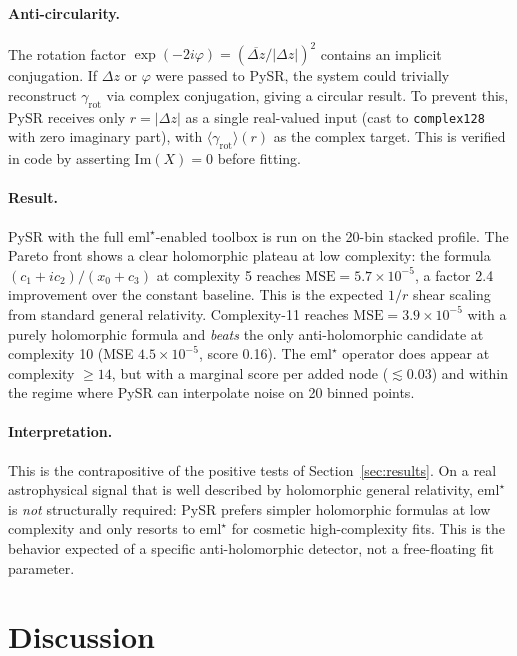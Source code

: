 \documentclass[12pt,a4paper]{article}
\newcommand{\emlstar}{\mathrm{eml}^{\star}}
\begin{document}
\paragraph{Anti-circularity.}
The rotation factor $\exp(-2i\varphi) = (\overline{\Delta z}/|\Delta z|)^2$
contains an implicit conjugation.
If $\Delta z$ or $\varphi$ were passed to PySR, the system could
trivially reconstruct $\gamma_\mathrm{rot}$ via complex conjugation,
giving a circular result.
To prevent this, PySR receives only $r = |\Delta z|$ as a single
real-valued input (cast to \texttt{complex128} with zero imaginary
part), with $\langle\gamma_\mathrm{rot}\rangle(r)$ as the complex
target.
This is verified in code by asserting $\mathrm{Im}(X) = 0$ before
fitting.

\paragraph{Result.}
PySR with the full $\emlstar$-enabled toolbox is run on the 20-bin
stacked profile.
The Pareto front shows a clear holomorphic plateau at low complexity:
the formula $(c_1 + ic_2) / (x_0 + c_3)$ at complexity 5 reaches
$\mathrm{MSE} = 5.7 \times 10^{-5}$, a factor 2.4 improvement over
the constant baseline.
This is the expected $1/r$ shear scaling from standard general
relativity.
Complexity-11 reaches $\mathrm{MSE} = 3.9 \times 10^{-5}$ with a
purely holomorphic formula and \emph{beats} the only
anti-holomorphic candidate at complexity 10
(MSE $4.5 \times 10^{-5}$, score 0.16).
The $\emlstar$ operator does appear at complexity $\geq 14$, but
with a marginal score per added node ($\lesssim 0.03$) and within
the regime where PySR can interpolate noise on 20 binned points.

\paragraph{Interpretation.}
This is the contrapositive of the positive tests of
Section~\ref{sec:results}.
On a real astrophysical signal that is well described by
holomorphic general relativity, $\emlstar$ is \emph{not} structurally
required: PySR prefers simpler holomorphic formulas at low complexity
and only resorts to $\emlstar$ for cosmetic high-complexity fits.
This is the behavior expected of a specific anti-holomorphic
detector, not a free-floating fit parameter.



\section{Discussion}
\label{sec:discussion}
\end{document}
